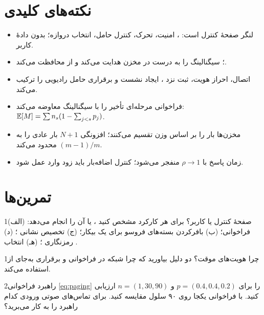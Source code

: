 \documentclass[11pt,a4paper]{article}
\begin{document}
\section{نکته‌های کلیدی}
\begin{takeawaybox}
\begin{itemize}
  \item {} لنگر صفحهٔ کنترل  است: ، امنیت، تحرک، کنترل حامل، انتخاب دروازه؛ بدون دادهٔ کاربر.
  \item {}؛  سیگنالینگ را به  درست در مخزن هدایت می‌کند و از 
        محافظت می‌کند.
  \item اتصال، احراز هویت، ثبت نزد ، ایجاد نشست و برقراری حامل رادیویی را ترکیب می‌کند.
  \item فراخوانی مرحله‌ای تأخیر را با سیگنالینگ معاوضه می‌کند: $\mathbb{E}[M] = \sum n_s(1-\sum_{j<s}p_j)$.
  \item مخزن‌ها بار را بر اساس وزن تقسیم می‌کنند؛ افزونگی $N+1$ بار عادی را به $(m-1)/m$ محدود می‌کند.
  \item زمان پاسخ با $\rho\to1$ منفجر می‌شود؛ کنترل اضافه‌بار باید زود وارد عمل شود.
\end{itemize}
\end{takeawaybox}

\section{تمرین‌ها}

\begin{exercisebox}{1}{صفحهٔ کنترل یا کاربر؟}\label{exr:split}
برای هر کارکرد مشخص کنید ،  یا  آن را انجام می‌دهد: (الف) فراخوانی؛ (ب) بافرکردن بسته‌های فروسو
برای یک  بیکار؛ (ج) تخصیص نشانی ؛ (د) رمزنگاری ؛ (هـ) انتخاب .
\end{exercisebox}

\begin{exercisebox}{1}{چرا هویت‌های موقت؟}\label{exr:guti}
دو دلیل بیاورید که چرا شبکه در فراخوانی و برقراری  به‌جای  از  استفاده می‌کند.
\end{exercisebox}

\begin{exercisebox}{2}{راهبرد فراخوانی}\label{exr:paging}
\cref{eq:paging} را برای $p = (0.4, 0.4, 0.2)$ و $n = (1, 30, 90)$ ارزیابی کنید. با فراخوانی یکجا روی ۹۰ سلول مقایسه کنید.
برای تماس‌های صوتی ورودی کدام راهبرد را به کار می‌برید؟
\end{exercisebox}
\end{document}

